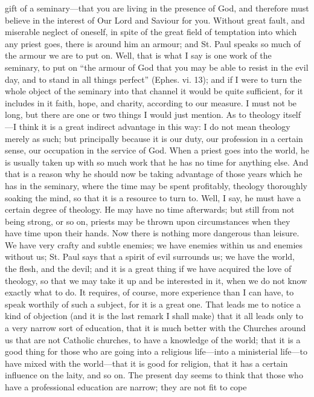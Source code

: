 gift of a seminary—that you are living in the presence of God, and
therefore must believe in the interest of Our Lord and Saviour for
you. Without great fault, and miserable neglect of oneself, in spite
of the great field of temptation into which any priest goes, there is
around him an armour; and St. Paul speaks so much of the armour we are
to put on. Well, that is what I say is one work of the seminary, to
put on ``the armour of God that you may be able to resist in the evil
day, and to stand in all things perfect'' (Ephes. vi. 13); and if I
were to turn the whole object of the seminary into that channel it
would be quite sufficient, for it includes in it faith, hope, and
charity, according to our measure. I must not be long, but there are
one or two things I would just mention. As to theology itself—I
think it is a great indirect advantage in this way: I do not mean
theology merely as such; but principally because it is our duty, our
profession in a certain sense, our occupation in the service of God.
When a priest goes into the world, he is usually taken up with so much
work that he has no time for anything else. And that is a reason why
he should now be taking advantage of those years which he has in the
seminary, where the time may be spent profitably, theology thoroughly
soaking the mind, so that it is a resource to turn to. Well, I say, he
must have a certain degree of theology. He may have no time
afterwards; but still from not being strong, or so on, priests may be
thrown upon circumstances when they have time upon their hands. Now
there is nothing more dangerous than leisure. We have very crafty and
subtle enemies; we have enemies within us and enemies without us; St.
Paul says that a spirit of evil surrounds us; we have the world, the
flesh, and the devil; and it is a great thing if we have acquired the
love of theology, so that we may take it up and be interested in it,
when we do not know exactly what to do. It requires, of course, more
experience than I can have, to speak worthily of such a subject, for
it is a great one. That leads me to notice a kind of objection (and it
is the last remark I shall make) that it all leads only to a very
narrow sort of education, that it is much better with the Churches
around us that are not Catholic churches, to have a knowledge of
the world; that it is a good thing for those who are going into a
religious life—into a ministerial life—to have mixed with the
world—that it is good for religion, that it has a certain influence
on the laity, and so on. The present day seems to think that those who
have a professional education are narrow; they are not fit to cope
